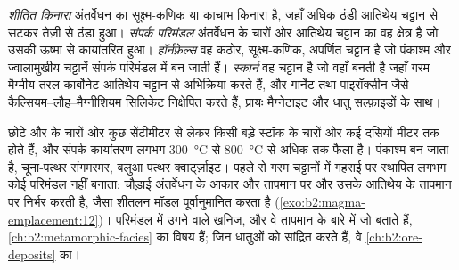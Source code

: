 \begin{definition}[संपर्क परिमंडल और उसकी चट्टानें]\label{def:b2:magma-emplacement:aureole}
\emph{शीतित किनारा} अंतर्वेधन का सूक्ष्म-कणिक या काचाभ किनारा है,
जहाँ  अधिक ठंडी आतिथेय चट्टान से सटकर तेज़ी से ठंडा हुआ।
\emph{संपर्क परिमंडल} अंतर्वेधन के चारों ओर आतिथेय चट्टान का वह क्षेत्र है
जो उसकी ऊष्मा से कायांतरित हुआ। \emph{हॉर्नफ़ेल्स}
वह कठोर, सूक्ष्म-कणिक, अपर्णित चट्टान है जो पंकाश्म और ज्वालामुखीय चट्टानें
संपर्क परिमंडल में बन जाती हैं। \emph{स्कार्न} वह चट्टान है जो वहाँ बनती है जहाँ गरम मैग्मीय
तरल कार्बोनेट आतिथेय चट्टान से अभिक्रिया करते हैं, और गार्नेट तथा पाइरॉक्सीन जैसे कैल्सियम--लौह--मैग्नीशियम
सिलिकेट निक्षेपित करते हैं, प्रायः मैग्नेटाइट और धातु सल्फ़ाइडों के साथ।
\end{definition}

 छोटे  और  के चारों ओर कुछ सेंटीमीटर से लेकर
किसी बड़े स्टॉक के चारों ओर कई दसियों मीटर तक होते हैं, और संपर्क कायांतरण
लगभग \qty{300}{\celsius} से \qty{800}{\celsius} से अधिक तक फैला है। पंकाश्म
 बन जाता है, चूना-पत्थर संगमरमर, बलुआ पत्थर क्वार्ट्ज़ाइट। पहले से गरम चट्टानों में
गहराई पर स्थापित  लगभग कोई परिमंडल नहीं बनाता: चौड़ाई
अंतर्वेधन के आकार और तापमान पर और उसके आतिथेय के तापमान पर निर्भर करती है, जैसा
शीतलन मॉडल पूर्वानुमानित करता है (\cref{exo:b2:magma-emplacement:12})। परिमंडल में उगने वाले खनिज,
और वे तापमान के बारे में जो बताते हैं, \cref{ch:b2:metamorphic-facies} का विषय हैं;
 जिन धातुओं को सांद्रित करते हैं, वे \cref{ch:b2:ore-deposits} का।

